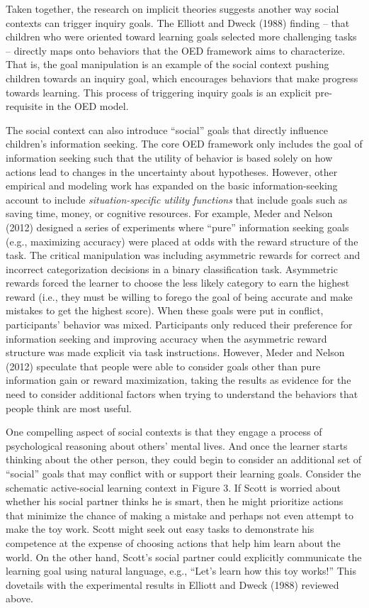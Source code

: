 \documentclass[english,floatsintext,man]{apa6}
\theoremstyle{definition}
\theoremstyle{definition}
\theoremstyle{definition}
\theoremstyle{remark}
\begin{document}
Taken together, the research on implicit theories suggests another way
social contexts can trigger inquiry goals. The Elliott and Dweck (1988)
finding -- that children who were oriented toward learning goals
selected more challenging tasks -- directly maps onto behaviors that the
OED framework aims to characterize. That is, the goal manipulation is an
example of the social context pushing children towards an inquiry goal,
which encourages behaviors that make progress towards learning. This
process of triggering inquiry goals is an explicit pre-requisite in the
OED model.

The social context can also introduce \enquote{social} goals that
directly influence children's information seeking. The core OED
framework only includes the goal of information seeking such that the
utility of behavior is based solely on how actions lead to changes in
the uncertainty about hypotheses. However, other empirical and modeling
work has expanded on the basic information-seeking account to include
\emph{situation-specific utility functions} that include goals such as
saving time, money, or cognitive resources. For example, Meder and
Nelson (2012) designed a series of experiments where \enquote{pure}
information seeking goals (e.g., maximizing accuracy) were placed at
odds with the reward structure of the task. The critical manipulation
was including asymmetric rewards for correct and incorrect
categorization decisions in a binary classification task. Asymmetric
rewards forced the learner to choose the less likely category to earn
the highest reward (i.e., they must be willing to forego the goal of
being accurate and make mistakes to get the highest score). When these
goals were put in conflict, participants' behavior was mixed.
Participants only reduced their preference for information seeking and
improving accuracy when the asymmetric reward structure was made
explicit via task instructions. However, Meder and Nelson (2012)
speculate that people were able to consider goals other than pure
information gain or reward maximization, taking the results as evidence
for the need to consider additional factors when trying to understand
the behaviors that people think are most useful.

One compelling aspect of social contexts is that they engage a process
of psychological reasoning about others' mental lives. And once the
learner starts thinking about the other person, they could begin to
consider an additional set of \enquote{social} goals that may conflict
with or support their learning goals. Consider the schematic
active-social learning context in Figure 3. If Scott is worried about
whether his social partner thinks he is smart, then he might prioritize
actions that minimize the chance of making a mistake and perhaps not
even attempt to make the toy work. Scott might seek out easy tasks to
demonstrate his competence at the expense of choosing actions that help
him learn about the world. On the other hand, Scott's social partner
could explicitly communicate the learning goal using natural language,
e.g., \enquote{Let's learn how this toy works!} This dovetails with the
experimental results in Elliott and Dweck (1988) reviewed above.
\end{document}

